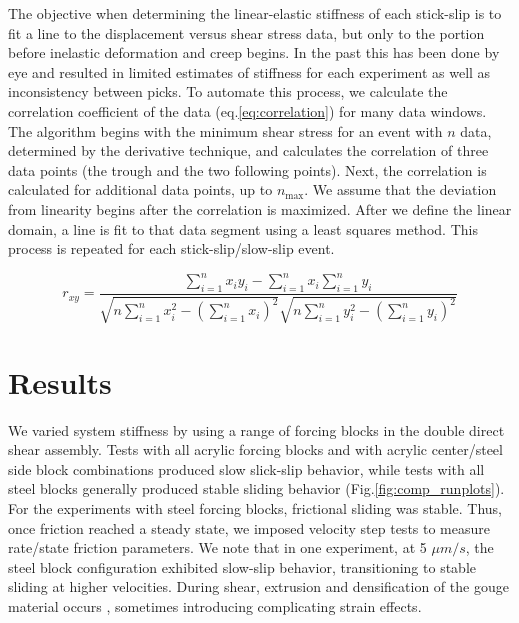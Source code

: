 The objective when determining the linear-elastic stiffness of each stick-slip
is to fit a line to the displacement versus shear stress data, but only to the
portion before inelastic deformation and creep begins.  In the past this has
been done by eye and resulted in limited estimates of stiffness for each
experiment as well as inconsistency between picks.  To automate this process, we
calculate the correlation coefficient of the data (eq.\ref{eq:correlation}) for
many data windows.  The algorithm begins with the minimum shear stress for an
event with $n$ data, determined by the derivative technique, and calculates the
correlation of three data points (the trough and the two following points).
Next, the correlation is calculated for additional data points, up to
$n_\text{max}$.  We assume that the deviation from linearity begins after the
correlation is maximized.  After we define the linear domain, a line is fit to
that data segment using a least squares method.  This process is repeated for
each stick-slip/slow-slip event.

\begin{equation}
	r_{xy}= \frac{\displaystyle\sum\limits_{i=1}^n x_i y_i - \displaystyle\sum\limits_{i=1}^n x_i \displaystyle\sum\limits_{i=1}^n y_i}{\sqrt{n \displaystyle\sum\limits_{i=1}^n x_i^2 - \left(\displaystyle\sum\limits_{i=1}^n x_i\right)^2} \sqrt{n \displaystyle\sum\limits_{i=1}^n y_i^2 - \left(\displaystyle\sum\limits_{i=1}^n y_i \right)^2}}
	\label{eq:correlation}
\end{equation}


\section{Results}

We varied system stiffness by using a range of forcing blocks in the double
direct shear assembly. Tests with all acrylic forcing blocks and with acrylic
center/steel side block combinations produced slow slick-slip behavior, while
tests with all steel blocks generally produced stable sliding behavior
(Fig.\ref{fig:comp_runplots}). For the experiments with steel forcing blocks,
frictional sliding was stable. Thus, once friction reached a steady state, we
imposed velocity step tests to measure rate/state friction parameters.  We note
that in one experiment, at 5 $\mu m/s$, the steel block configuration exhibited
slow-slip behavior, transitioning to stable sliding at higher velocities. During
shear, extrusion and densification of the gouge material occurs
\cite{scott1994apparent}, sometimes introducing complicating strain effects.

